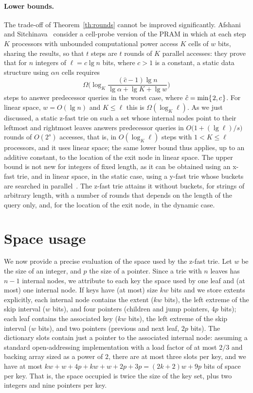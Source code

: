 \documentclass[a4paper]{article}
\newcommand{\?}{\mskip1.5mu}
\begin{document}
\paragraph{Lower bounds.} The trade-off of Theorem~\ref{th:rounds} cannot be improved significantly. 
Afshani and Sitchinava~\cite{Afshani2025Cell} consider a cell-probe version of the PRAM in which at each step $K$ processors with 
unbounded computational power access $K$ cells of $w$ bits, sharing the results, so that $t$ steps are $t$ rounds of $K$ parallel accesses:
they prove that for $n$ integers of $\ell=c\lg n$ bits, where $c>1$ is a constant, a static data structure using $\alpha n$ cells requires
\[
\Omega\biggl(\log_K\frac{(\hat c-1)\lg n}{\lg\alpha+\lg K+\lg w}\biggr)
\]
steps to answer predecessor queries in the worst case, where $\hat c=\min\{\?2,c\?\}$. For linear space, $w=O(\lg n)$ and $K\leq\ell$ this is $\Omega(\log_K\ell)$. As we just discussed, a static z-fast trie on such a set whose internal nodes point 
to their leftmost and rightmost leaves answers predecessor queries in $O\bigl(1+(\lg\ell)/s\bigr)$ rounds of $O(2^s)$ accesses, that is, 
in $O(\log_K\ell)$ steps with $1<K\leq\ell$ processors, and it uses linear space; the same lower bound thus applies, up to an additive constant, 
to the location of the exit node in linear space. The upper bound is not new for integers of fixed length, as it can be obtained using an x-fast trie, and in linear space, in the static case, using a 
y-fast trie whose buckets are searched in parallel~\cite{Afshani2025Cell}. The z-fast trie attains it without buckets, 
for strings of arbitrary length, with a number of rounds that depends on the length of the query only, and, for the location of the exit node,
in the dynamic case.

\section{Space usage}
\label{sec:spaceusage}

We now provide a precise evaluation of the space used by the z-fast trie. Let $w$ be the size of an integer,
and $p$ the size of a pointer. Since a trie with $n$ leaves has $n-1$ internal nodes, we attribute to each key 
the space used by one leaf and (at most) one internal node. If keys have (at most) size $kw$ bits and we store extents explicitly,  
each internal node 
contains the extent ($kw$ bits), the left extreme of the skip interval ($w$ bits), and four pointers (children and jump pointers, $4p$ bits); each
leaf contains the associated key ($kw$ bits), the left extreme of the skip interval ($w$ bits), and two pointers (previous and next leaf, $2p$ bits).
The dictionary slots contain just a pointer to the associated internal node: assuming a standard open-addressing
implementation with a load factor of at most $2/3$ and backing array sized as a power of $2$, there are at most three slots per key, and we have
at most $kw + w + 4p + kw + w + 2p + 3p = (2k + 2)w +9p$ bits of space per key.
That is, the space occupied is twice the size of the key set, plus two integers and nine pointers per key.
\end{document}

